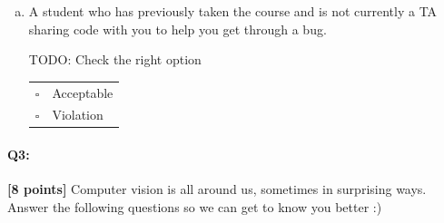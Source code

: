 \documentclass[11pt]{article}
\begin{document}
\begin{enumerate}[(a)]
\item
A student who has previously taken the course and is not currently a TA sharing code with you to help you get through a bug.

\begin{tcolorbox}[colback=white!5!white,colframe=green!75!black]
TODO: Check the right option

\begin{tabular}[h]{ll}
$\square$ & Acceptable \\
$\square$ & Violation \\
\end{tabular}
\end{tcolorbox}

\end{enumerate}




\pagebreak

\paragraph{Q3:} \textbf{[8 points]} Computer vision is all around us, sometimes in surprising ways. Answer the following questions so we can get to know you better :)
\end{document}
